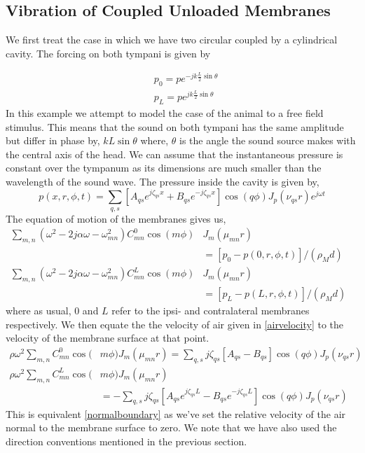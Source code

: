 \documentclass[a4paper,10pt]{article}
\begin{document}
\subsection{Vibration of Coupled Unloaded Membranes}
We first treat the case in which we have two circular coupled by a cylindrical cavity. The forcing
on both tympani is given by

\begin{align}
 &p_0=pe^{-jk\frac{L}{2}\sin\theta}\\
 &p_L=pe^{jk\frac{L}{2}\sin\theta}
\end{align}
In this example we attempt to model the case of the animal to a free field stimulus. This means
that the sound on both tympani has the same amplitude but differ in phase by, $kL\sin\theta$ where,
$\theta$ is the angle the sound source makes with the central axis of the head. We can assume that
the instantaneous pressure is constant over the tympanum as its dimensions are much smaller than 
the wavelength of the sound wave.
The pressure inside the cavity is given by,
\begin{equation}\label{CylCavityPressure}
 p(x,r,\phi,t)=\sum_{q,s}\left[A_{qs}e^{j\zeta_{qs}x}+B_{qs}e^{-j\zeta_{qs}x}\right]\cos(q\phi) J_p(\nu_{qs}r)e^{j\omega t}
\end{equation}
The equation of motion of the membranes gives us,
\begin{align}
 \sum_{m,n}\left(\omega^2-2j\alpha\omega-\omega^2_{mn}\right)C^0_{mn}\cos(m\phi)&J_m(\mu_{mn}r)\nonumber\\
 &=\left[p_0-p(0,r,\phi,t)\right]/(\rho_M d)\label{membraneEOM1a}\\
 \sum_{m,n}\left(\omega^2-2j\alpha\omega-\omega^2_{mn}\right)C^L_{mn}\cos(m\phi)&J_m(\mu_{mn}r)&\nonumber\\
 &=\left[p_L-p(L,r,\phi,t)\right]/(\rho_M d)\label{membraneEOM1b}
\end{align}
where as usual, $0$ and $L$ refer to the ipsi- and contralateral membranes respectively. We then equate the
the velocity of air given in \eqref{airvelocity} to the velocity of the membrane surface at that point. 
\begin{align}
 \rho\omega^2\sum_{m,n}C^0_{mn}\cos(&m\phi)J_m(\mu_{mn}r)=\sum_{q,s}j\zeta_{qs}\left[A_{qs}-B_{qs}\right]\cos(q\phi) J_p(\nu_{qs}r)\label{vboundary1a}\\
 \rho\omega^2\sum_{m,n}C^L_{mn}\cos(&m\phi)J_m(\mu_{mn}r)\nonumber\\
 &=-\sum_{q,s}j\zeta_{qs}\left[A_{qs}e^{j\zeta_{qs}L}-B_{qs}e^{-j\zeta_{qs}L}\right]\cos(q\phi) J_p(\nu_{qs}r)\label{vboundary1b}
\end{align}
This is equivalent \eqref{normalboundary} as we've set the relative velocity of the air normal to the 
membrane surface to zero. We note that we have also used the direction conventions mentioned in the previous section.
\end{document}
